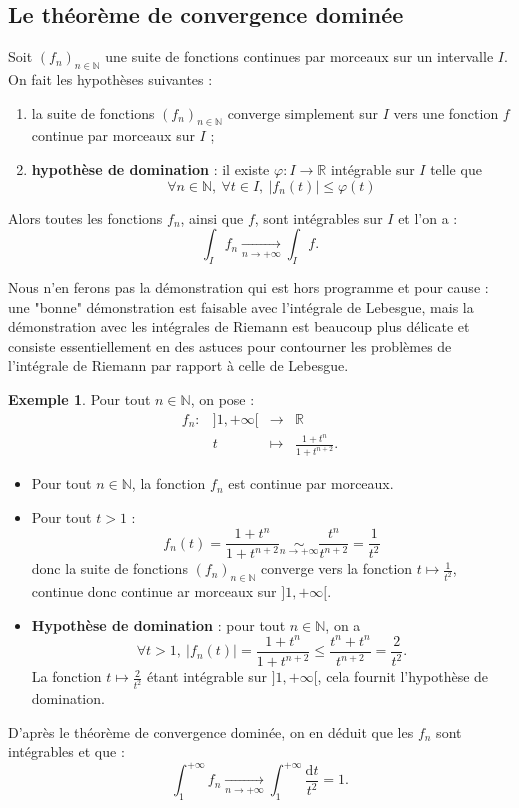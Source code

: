 \documentclass[french]{article}
\newcommand{\N}{\mathbb{N}}
\newcommand{\R}{\mathbb{R}}
\renewcommand{\d}{\text{d}}
\theoremstyle{plain}
\theoremstyle{definition}
\newtheorem*{ex}{Exemple}
\theoremstyle{remark}
\begin{document}
\subsection{Le théorème de convergence dominée}

\begin{thm}
	Soit $(f_n)_{n\in\N}$ une suite de fonctions continues par morceaux sur un intervalle $I$. On fait les hypothèses suivantes : 
	\begin{enumerate}
		\item la suite de fonctions $(f_n)_{n\in\N}$ converge simplement sur $I$ vers une fonction $f$ continue par morceaux sur $I$ ;
		\item \textbf{hypothèse de domination} : il existe $\varphi:I\to\R$ intégrable sur $I$ telle que $$\forall n\in\N,\ \forall t\in I,\ \lvert f_n(t)\rvert\leqslant \varphi(t)$$
	\end{enumerate}
	Alors toutes les fonctions $f_n$, ainsi que $f$, sont intégrables sur $I$ et l'on a : $$\int_I f_n\xrightarrow[n\to+\infty]{}\int_I f.$$
\end{thm}
Nous n'en ferons pas la démonstration qui est hors programme et pour cause : une "bonne" démonstration est faisable avec l'intégrale de Lebesgue, mais la démonstration avec les intégrales de Riemann est beaucoup plus délicate et consiste essentiellement en des astuces pour contourner les problèmes de l'intégrale de Riemann par rapport à celle de Lebesgue.

\begin{ex}
	Pour tout $n\in\N$, on pose : $$\begin{array}{lrcl}
		f_n:&]1,+\infty[&\longrightarrow&\R\\
		&t&\longmapsto&\displaystyle\frac{1+t^n}{1+t^{n+2}}.
	\end{array}$$
	\begin{itemize}
		\item Pour tout $n\in\N$, la fonction $f_n$ est continue par morceaux.
		\item Pour tout $t>1$ : $$f_n(t)=\displaystyle\frac{1+t^n}{1+t^{n+2}}\underset{n\to +\infty}{\sim}\frac{t^n}{t^{n+2}}=\frac{1}{t^2}$$ donc la suite de fonctions $(f_n)_{n\in\N}$ converge vers la fonction $t\mapsto\displaystyle\frac{1}{t^2}$, continue donc continue ar morceaux sur $]1,+\infty[$.
		\item \textbf{Hypothèse de domination} : pour tout $n\in\N$, on a $$\forall t>1,\ \lvert f_n(t)\rvert=\displaystyle\frac{1+t^n}{1+t^{n+2}}\leqslant\frac{t^n+t^n}{t^{n+2}}=\frac{2}{t^2}.$$ La fonction $t\mapsto\displaystyle\frac{2}{t^2}$ étant intégrable sur $]1,+\infty[$, cela fournit l'hypothèse de domination.
	\end{itemize}
	D'après le théorème de convergence dominée, on en déduit que les $f_n$ sont intégrables et que : $$\int_{1}^{+\infty}f_n\xrightarrow[n\to+\infty]{}\int_{1}^{+\infty}\frac{\d t}{t^2}=1.$$
\end{ex}
\end{document}
